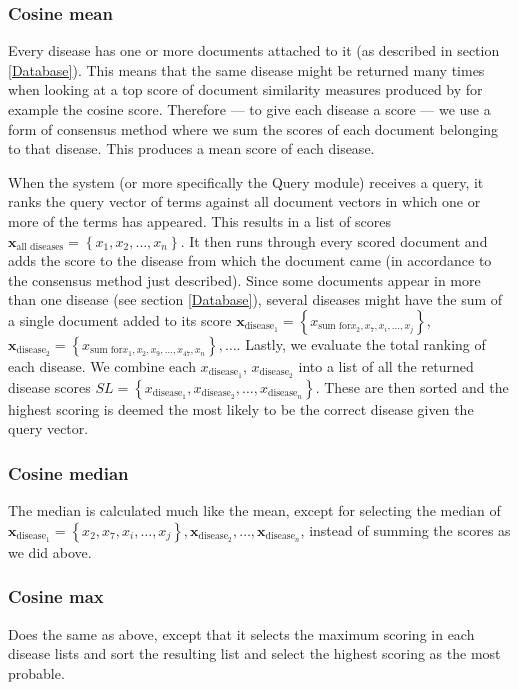 \subsubsection{Cosine mean}
Every disease has one or more documents attached to it (as described
in section \ref{Database}). This means that the same disease might be
returned many times when looking at a top score of document similarity
measures produced by for example the cosine score. Therefore --- to
give each disease a score --- we use a form of consensus method where
we sum the scores of each document belonging to that disease. This
produces a mean score of each disease.

When the system (or more specifically the Query module) receives a
query, it ranks the query vector of terms against all document vectors
in which one or more of the terms has appeared. This results in a list
of scores $\mathbf{x}_{\textrm{all diseases}} = \left\{x_1, x_2,
\dots, x_n \right\}$. It then runs through every scored document and
adds the score to the disease from which the document came (in
accordance to the consensus method just described). Since some
documents appear in more than one disease (see section
\ref{Database}), several diseases might have the sum of a single
document added to its score $\mathbf{x}_{\textrm{disease}_{1}} =
\left\{x_{\textrm{sum for} x_2, x_7, x_i, \dots, x_j}\right\}$,
$\mathbf{x}_{\textrm{disease}_{2}} = \left\{x_{\textrm{sum for} x_1,
  x_2, x_9, \dots, x_47, x_n}\right\}, \dots$. Lastly, we evaluate the
total ranking of each disease. We combine each
$x_{\textrm{disease}_1}$, $x_{\textrm{disease}_2}$ into a list of all
the returned disease scores $\mathbf{\mathit{SL}} =
\left\{x_{\textrm{disease}_1},x_{\textrm{disease}_2}, \dots,
x_{\textrm{disease}_n}\right\}$. These are then sorted and the highest
scoring is deemed the most likely to be the correct disease given the
query vector.

\subsubsection{Cosine median}
The median is calculated much like the mean, except for selecting the
median of $\mathbf{x}_{\textrm{disease}_{1}} = \left\{x_2,x_7, x_i,
\dots, x_j\right\}, \mathbf{x}_{\textrm{disease}_{2}}, \dots,
\mathbf{x}_{\textrm{disease}_{n}}$, instead of summing the scores as
we did above.

\subsubsection{Cosine max}
Does the same as above, except that it selects the maximum scoring in each
disease lists and sort the resulting list and select the highest
scoring as the most probable.

